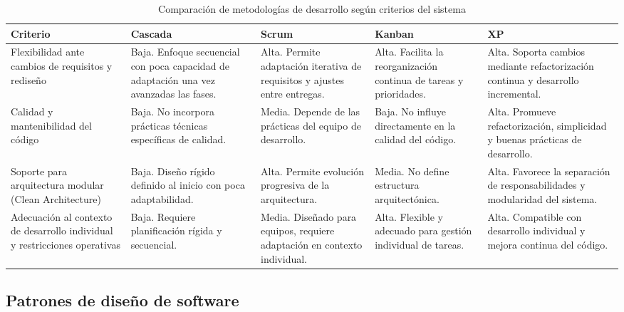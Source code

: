 \begin{table}[h!]
\centering
\renewcommand{\arraystretch}{1.3}
\begin{tabular}{|p{3.5cm}|p{2.8cm}|p{2.8cm}|p{2.8cm}|p{2.8cm}|}
\hline
\textbf{Criterio} & \textbf{Cascada} & \textbf{Scrum} & \textbf{Kanban} & \textbf{XP} \\
\hline

Flexibilidad ante cambios de requisitos y rediseño 
& Baja. Enfoque secuencial con poca capacidad de adaptación una vez avanzadas las fases. 
& Alta. Permite adaptación iterativa de requisitos y ajustes entre entregas. 
& Alta. Facilita la reorganización continua de tareas y prioridades. 
& Alta. Soporta cambios mediante refactorización continua y desarrollo incremental. \\
\hline

Calidad y mantenibilidad del código 
& Baja. No incorpora prácticas técnicas específicas de calidad. 
& Media. Depende de las prácticas del equipo de desarrollo. 
& Baja. No influye directamente en la calidad del código. 
& Alta. Promueve refactorización, simplicidad y buenas prácticas de desarrollo. \\
\hline

Soporte para arquitectura modular (Clean Architecture) 
& Baja. Diseño rígido definido al inicio con poca adaptabilidad. 
& Alta. Permite evolución progresiva de la arquitectura. 
& Media. No define estructura arquitectónica. 
& Alta. Favorece la separación de responsabilidades y modularidad del sistema. \\
\hline

Adecuación al contexto de desarrollo individual y restricciones operativas 
& Baja. Requiere planificación rígida y secuencial. 
& Media. Diseñado para equipos, requiere adaptación en contexto individual. 
& Alta. Flexible y adecuado para gestión individual de tareas. 
& Alta. Compatible con desarrollo individual y mejora continua del código. \\
\hline

\end{tabular}
\caption{Comparación de metodologías de desarrollo según criterios del sistema}
\label{tab:comparacion_metodologias_4criterios}
\end{table}

\subsection{Patrones de diseño de software}


